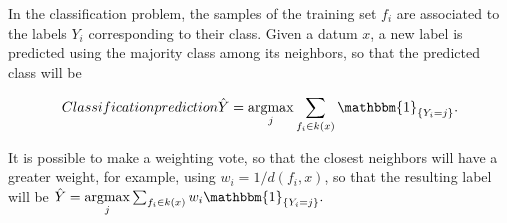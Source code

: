 
In the classification problem, the samples of the training set
$f_i$ are associated to the labels $Y_i$ corresponding to their class.
Given a datum $x$, a new label is predicted using the majority class among
its neighbors, so that the predicted class will be

\begin{equation}{Classification prediction}
\hat Y =\underset{j}{\operatorname{argmax}} \sum_{f_i \in k(x)} \mathbbm{1}_{\{ Y_i = j\}}.
\end{equation}

It is possible to make a weighting vote, so that the closest neighbors will have
a greater weight, for example, using $w_i=1/d(f_i, x)$, so that the
resulting label will be
$
\hat Y = \underset{j}{\operatorname{argmax}}  \sum_{f_i \in k(x)} w_i\mathbbm{1}_{\{ Y_i = j\}}.
$
